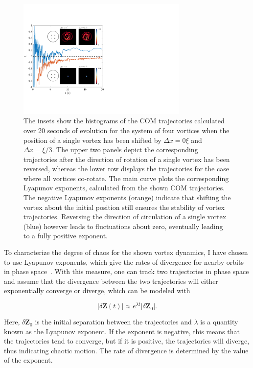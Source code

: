 \begin{figure}
\center \includegraphics[width=0.75\textwidth]{data/2d/lyap/lyap}

\caption{
The insets show the histograms of the COM trajectories calculated over 20 seconds of evolution for the system of four vortices when the position of a single vortex has been shifted by $\Delta x=0\xi$ and $\Delta x=\xi/3$.
The upper two panels depict the corresponding trajectories after the direction of rotation of a single vortex has been reversed, whereas the lower row displays the trajectories for the case where all vortices co-rotate.
The main curve plots the corresponding Lyapunov exponents,  calculated from the shown COM trajectories. 
The negative Lyapunov exponents (orange) indicate that shifting the vortex about the initial position still ensures the stability of vortex trajectories. Reversing the direction of circulation of a single vortex (blue) however leads to fluctuations about zero, eventually leading to a fully positive exponent. 
}
\label{fig:lyap}
\end{figure}


To characterize the degree of chaos for the shown vortex dynamics, I have chosen to use Lyapunov exponents, which give the rates of divergence for nearby orbits in phase space~\cite{wolf1985}.
With this measure, one can track two trajectories in phase space and assume that the divergence between the two trajectories will either exponentially converge or diverge, which can be modeled with

\begin{equation}
|\delta\mathbf{Z}(t)| \approx e^{\lambda t} |\delta \mathbf{Z}_0|.
\end{equation}

\noindent Here, $\delta\mathbf{Z}_0$ is the initial separation between the trajectories and $\lambda$ is a quantity known as the Lyapunov exponent.
If the exponent is negative, this means that the trajectories tend to converge, but if it is positive, the trajectories will diverge, thus indicating chaotic motion.
The rate of divergence is determined by the value of the exponent.

